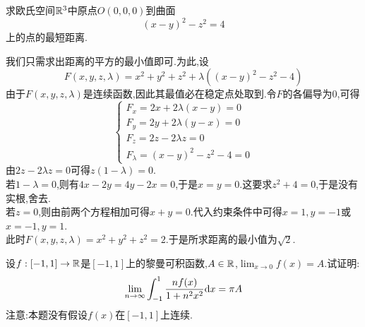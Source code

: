 \documentclass{ctexart}
\begin{document}
\begin{problem}[7.(15\songti{分})]
    求欧氏空间$\mathbb{R}^3$中原点$O(0,0,0)$到曲面\[(x-y)^2-z^2=4\]上的点的最短距离.
\end{problem}
\begin{solution}
    我们只需求出距离的平方的最小值即可.为此,设
    \[F(x,y,z,\lambda)=x^2+y^2+z^2+\lambda((x-y)^2-z^2-4)\]
    由于$F(x,y,z,\lambda)$是连续函数,因此其最值必在稳定点处取到.令$F$的各偏导为$0$,可得
    \[\left\{\begin{array}{l}
        F_x=2x+2\lambda(x-y)=0\\
        F_y=2y+2\lambda(y-x)=0\\
        F_z=2z-2\lambda z=0\\
        F_\lambda=(x-y)^2-z^2-4=0
    \end{array}\right.\]
    由$2z-2\lambda z=0$可得$z(1-\lambda)=0$.\\
    若$1-\lambda=0$,则有$4x-2y=4y-2x=0$,于是$x=y=0$.这要求$z^2+4=0$,于是没有实根,舍去.\\
    若$z=0$,则由前两个方程相加可得$x+y=0$.代入约束条件中可得$x=1,y=-1$或$x=-1,y=1$.\\
    此时$F(x,y,z,\lambda)=x^2+y^2+z^2=2$.于是所求距离的最小值为$\sqrt2$.
\end{solution}
\begin{problem}[8.(15\songti{分})]
    设$f:[-1,1]\to\mathbb{R}$是$[-1,1]$上的黎曼可积函数,$A\in\mathbb{R}$,$\displaystyle\lim_{x\to0}f(x)=A$.试证明:
    \[\lim_{n\to\infty}\int_{-1}^{1}\dfrac{nf(x)}{1+n^2x^2}\mathrm{d} x=\pi A\]
    注意:本题没有假设$f(x)$在$[-1,1]$上连续.
\end{problem}
\end{document}

